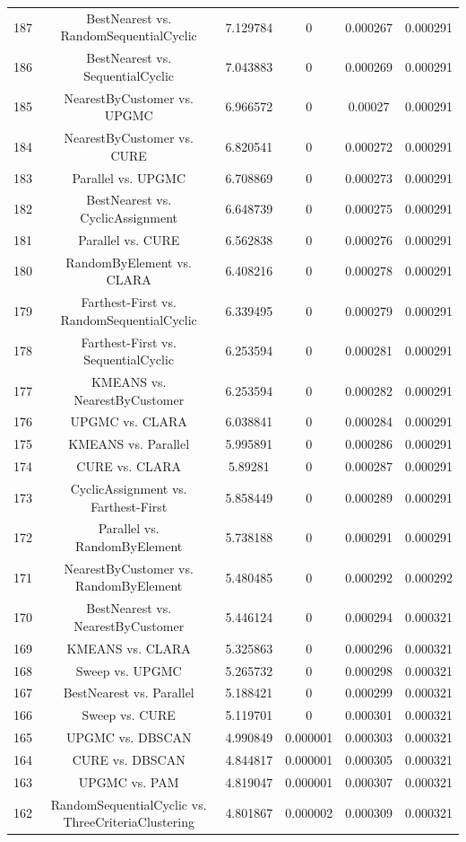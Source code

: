 \documentclass[a4paper,10pt]{article}
\begin{document}
\begin{landscape}
\begin{table}[!htp]
\begin{tabular}{cccccc}
187&BestNearest vs. RandomSequentialCyclic&7.129784&0&0.000267&0.000291\\
186&BestNearest vs. SequentialCyclic&7.043883&0&0.000269&0.000291\\
185&NearestByCustomer vs. UPGMC&6.966572&0&0.00027&0.000291\\
184&NearestByCustomer vs. CURE&6.820541&0&0.000272&0.000291\\
183&Parallel vs. UPGMC&6.708869&0&0.000273&0.000291\\
182&BestNearest vs. CyclicAssignment&6.648739&0&0.000275&0.000291\\
181&Parallel vs. CURE&6.562838&0&0.000276&0.000291\\
180&RandomByElement vs. CLARA&6.408216&0&0.000278&0.000291\\
179&Farthest-First vs. RandomSequentialCyclic&6.339495&0&0.000279&0.000291\\
178&Farthest-First vs. SequentialCyclic&6.253594&0&0.000281&0.000291\\
177&KMEANS vs. NearestByCustomer&6.253594&0&0.000282&0.000291\\
176&UPGMC vs. CLARA&6.038841&0&0.000284&0.000291\\
175&KMEANS vs. Parallel&5.995891&0&0.000286&0.000291\\
174&CURE vs. CLARA&5.89281&0&0.000287&0.000291\\
173&CyclicAssignment vs. Farthest-First&5.858449&0&0.000289&0.000291\\
172&Parallel vs. RandomByElement&5.738188&0&0.000291&0.000291\\
171&NearestByCustomer vs. RandomByElement&5.480485&0&0.000292&0.000292\\
170&BestNearest vs. NearestByCustomer&5.446124&0&0.000294&0.000321\\
169&KMEANS vs. CLARA&5.325863&0&0.000296&0.000321\\
168&Sweep vs. UPGMC&5.265732&0&0.000298&0.000321\\
167&BestNearest vs. Parallel&5.188421&0&0.000299&0.000321\\
166&Sweep vs. CURE&5.119701&0&0.000301&0.000321\\
165&UPGMC vs. DBSCAN&4.990849&0.000001&0.000303&0.000321\\
164&CURE vs. DBSCAN&4.844817&0.000001&0.000305&0.000321\\
163&UPGMC vs. PAM&4.819047&0.000001&0.000307&0.000321\\
162&RandomSequentialCyclic vs. ThreeCriteriaClustering&4.801867&0.000002&0.000309&0.000321\\

\end{tabular}
\end{table}
\end{landscape}
\end{document}
